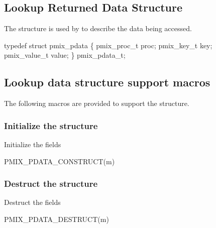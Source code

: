 \subsection{Lookup Returned Data Structure}

The  structure is used by  to describe the data being accessed.

\cspecificstart
\begin{codepar}
typedef struct pmix_pdata \{
    pmix_proc_t proc;
    pmix_key_t key;
    pmix_value_t value;
\} pmix_pdata_t;
\end{codepar}
\cspecificend

\subsection{Lookup data structure support macros}

The following macros are provided to support the  structure.

\subsubsection{Initialize the  structure}

Initialize the  fields

\cspecificstart
\begin{codepar}
PMIX_PDATA_CONSTRUCT(m)
\end{codepar}
\cspecificend

\begin{arglist}
\end{arglist}

\subsubsection{Destruct the  structure}

Destruct the  fields

\cspecificstart
\begin{codepar}
PMIX_PDATA_DESTRUCT(m)
\end{codepar}
\cspecificend

\begin{arglist}
\end{arglist}

